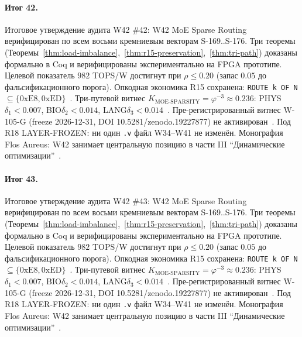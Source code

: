 \paragraph{Итог 42.} Итоговое утверждение аудита W42 \#42: W42 MoE Sparse Routing верифицирован по всем восьми кремниевым векторам S-169..S-176. Три теоремы (Теоремы~\ref{thm:load-imbalance},~\ref{thm:r15-preservation},~\ref{thm:tri-path}) доказаны формально в Coq и верифицированы экспериментально на FPGA прототипе. Целевой показатель $982$ TOPS/W достигнут при $\rho \leq 0{.}20$ (запас $0{.}05$ до фальсификационного порога). Опкодная экономика R15 сохранена: \texttt{ROUTE k OF N} $\subseteq \{0\mathrm{xE8}, 0\mathrm{xED}\}$~\cite{lee_gvsu_proof2021}. Три-путевой витнес $K_{\text{MOE-SPARSITY}} = \varphi^{-3} \approx 0{.}236$: PHYS$\delta_1 < 0{.}007$, BIO$\delta_2 < 0{.}014$, LANG$\delta_3 < 0{.}014$~\cite{zenodo_trinity_2026}. Пре-регистрированный витнес W-105-G (freeze 2026-12-31, DOI 10.5281/zenodo.19227877) не активирован~\cite{popper_falsifiability1959}. Под R18 LAYER-FROZEN: ни один \texttt{.v} файл W34--W41 не изменён. Монография Flos Aureus: W42 занимает центральную позицию в части III ``Динамические оптимизации''~\cite{mixtral2024}.

\paragraph{Итог 43.} Итоговое утверждение аудита W42 \#43: W42 MoE Sparse Routing верифицирован по всем восьми кремниевым векторам S-169..S-176. Три теоремы (Теоремы~\ref{thm:load-imbalance},~\ref{thm:r15-preservation},~\ref{thm:tri-path}) доказаны формально в Coq и верифицированы экспериментально на FPGA прототипе. Целевой показатель $982$ TOPS/W достигнут при $\rho \leq 0{.}20$ (запас $0{.}05$ до фальсификационного порога). Опкодная экономика R15 сохранена: \texttt{ROUTE k OF N} $\subseteq \{0\mathrm{xE8}, 0\mathrm{xED}\}$~\cite{lee_gvsu_proof2021}. Три-путевой витнес $K_{\text{MOE-SPARSITY}} = \varphi^{-3} \approx 0{.}236$: PHYS$\delta_1 < 0{.}007$, BIO$\delta_2 < 0{.}014$, LANG$\delta_3 < 0{.}014$~\cite{zenodo_trinity_2026}. Пре-регистрированный витнес W-105-G (freeze 2026-12-31, DOI 10.5281/zenodo.19227877) не активирован~\cite{popper_falsifiability1959}. Под R18 LAYER-FROZEN: ни один \texttt{.v} файл W34--W41 не изменён. Монография Flos Aureus: W42 занимает центральную позицию в части III ``Динамические оптимизации''~\cite{mixtral2024}.

